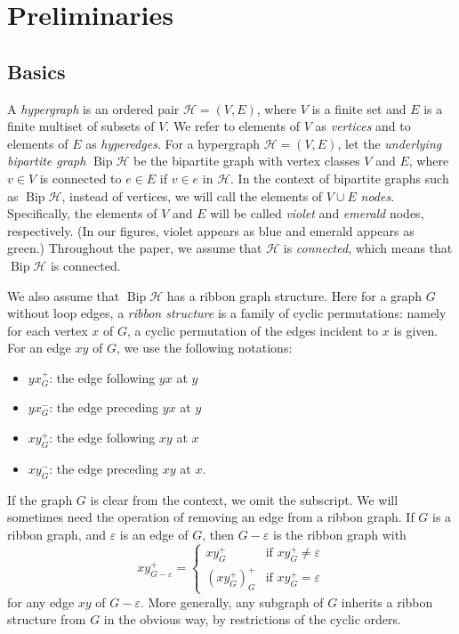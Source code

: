 \documentclass[10pt]{amsart}
\theoremstyle{definition}\newtheorem{defi}[theo]{Definition}
\theoremstyle{remark}\newtheorem{rema}[theo]{Remark}
\newcommand{\HH}{\mathcal H}
\DeclareMathOperator{\bip}{Bip}
\begin{document}
\section{Preliminaries} \label{sec:prelim}


\subsection{Basics}

A \emph{hypergraph} is an ordered pair $\HH=(V,E)$, where $V$ is a finite set and $E$ is a finite multiset of subsets of $V$. We refer to elements of $V$ as \emph{vertices} and to elements of $E$ as \emph{hyperedges}. For a hypergraph $\mathcal{H}=(V,E)$, let the \emph{underlying bipartite graph} $\bip\HH$ be the bipartite graph with vertex classes $V$ and $E$, where $v\in V$ is connected to $e\in E$ if $v\in e$ in $\HH$. In the context of bipartite graphs such as $\bip\HH$, instead of vertices, we will call the elements of $V\cup E$ \emph{nodes}. Specifically, the elements of $V$ and $E$ will be called \emph{violet} and \emph{emerald} nodes, respectively. (In our figures, violet appears as blue and emerald appears as green.) Throughout the paper, we assume that $\HH$ is \emph{connected}, which means that $\bip \HH$ is connected.

We also assume that $\bip\HH$ has a ribbon graph structure. Here for a graph $G$ without loop edges, a \emph{ribbon structure} is a family of cyclic permutations: namely for each vertex $x$ of $G$, a cyclic permutation of the edges incident to $x$ is given. For an edge $xy$ of $G$, we use the following notations:
\begin{itemize}
\item $yx^+_G$: the edge following $yx$ at $y$
\item $yx^-_G$: the edge preceding $yx$ at $y$
\item $xy^+_G$: the edge following $xy$ at $x$
\item $xy^-_G$: the edge preceding $xy$ at $x$.
\end{itemize}
If the graph $G$ is clear from the context, we omit the subscript. We will sometimes need the operation of removing an edge from a ribbon graph. If $G$ is a ribbon graph, and $\varepsilon$ is an edge of $G$, then $G-\varepsilon$ is the ribbon graph with
\[
xy^+_{G-\varepsilon}= \begin{cases} xy_G^+ & \text{if } xy_G^+\neq \varepsilon \\
(xy_G^+)_G^+ & \text{if } xy_G^+=\varepsilon
\end{cases} 
\]
for any edge $xy$ of $G-\varepsilon$. More generally, any subgraph of $G$ inherits a ribbon structure from $G$ in the obvious way, by restrictions of the cyclic orders.
\end{document}
